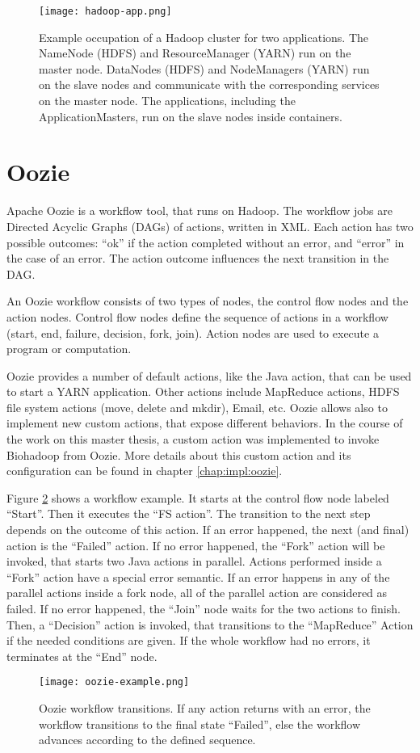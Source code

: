 \begin{figure}[ht!]
  \centering
  \texttt{[image: hadoop-app.png]}
  \caption{Example occupation of a Hadoop cluster for two applications. The NameNode (HDFS) and ResourceManager (YARN) run on the master node. DataNodes (HDFS) and NodeManagers (YARN) run on the slave nodes and communicate with the corresponding services on the master node. The applications, including the ApplicationMasters, run on the slave nodes inside containers.}
  \label{fig:hadoop-app}
\end{figure}

\section{Oozie}
Apache Oozie is a workflow tool, that runs on Hadoop. The workflow jobs are Directed Acyclic Graphs (DAGs) of actions, written in XML. Each action has two possible outcomes: ``ok'' if the action completed without an error, and ``error'' in the case of an error. The action outcome influences the next transition in the DAG. 

An Oozie workflow consists of two types of nodes, the control flow nodes and the action nodes. Control flow nodes define the sequence of actions in a workflow (start, end, failure, decision, fork, join). Action nodes are used to execute a program or computation.

Oozie provides a number of default actions, like the Java action, that can be used to start a YARN application. Other actions include MapReduce actions, HDFS file system actions (move, delete and mkdir), Email, etc. Oozie allows also to implement new custom actions, that expose different behaviors. In the course of the work on this master thesis, a custom action was implemented to invoke Biohadoop from Oozie. More details about this custom action and its configuration can be found in chapter \ref{chap:impl:oozie}.

Figure \ref{fig:oozie-example} shows a workflow example. It starts at the control flow node labeled ``Start''. Then it executes the ``FS action''. The transition to the next step depends on the outcome of this action. If an error happened, the next (and final) action is the ``Failed'' action. If no error happened, the ``Fork'' action will be invoked, that starts two Java actions in parallel. Actions performed inside a ``Fork'' action have a special error semantic. If an error happens in any of the parallel actions inside a fork node, all of the parallel action are considered as failed. If no error happened, the ``Join'' node waits for the two actions to finish. Then, a ``Decision'' action is invoked, that transitions to the ``MapReduce'' Action if the needed conditions are given. If the whole workflow had no errors, it terminates at the ``End'' node.

\begin{figure}[ht!]
  \centering
  \texttt{[image: oozie-example.png]}
  \caption{Oozie workflow transitions. If any action returns with an error, the workflow transitions to the final state ``Failed'', else the workflow advances according to the defined sequence.}
  \label{fig:oozie-example}
\end{figure}